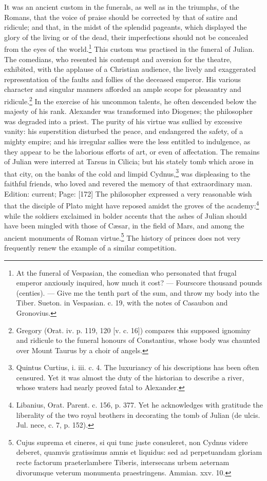 It was an ancient custom in the funerals, as well as in the triumphs, of the Romans, that the voice of praise should be corrected by that of satire and ridicule; and that, in the midst of the splendid pageants, which displayed the glory of the living or of the dead, their imperfections should not be concealed from the eyes of the world.\footnote{At the funeral of Vespasian, the comedian who personated that frugal emperor anxiously inquired, how much it cost? \texthebrew{—} Fourscore thousand pounds (centies). \texthebrew{—} Give me the tenth part of the sum, and throw my body into the Tiber. Sueton. in Vespasian. c. 19, with the notes of Casaubon and Gronovius.} This custom was practised in the funeral of Julian. The comedians, who resented his contempt and aversion for the theatre, exhibited, with the applause of a Christian audience, the lively and exaggerated representation of the faults and follies of the deceased emperor. His various character and singular manners afforded an ample scope for pleasantry and ridicule.\footnote{Gregory (Orat. iv. p. 119, 120 [v. c. 16]) compares this supposed ignominy and ridicule to the funeral honours of Constantius, whose body was chaunted over Mount Taurus by a choir of angels.} In the exercise of his uncommon talents, he often descended below the majesty of his rank. Alexander was transformed into Diogenes; the philosopher was degraded into a priest. The purity of his virtue was sullied by excessive vanity: his superstition disturbed the peace, and endangered the safety, of a mighty empire; and his irregular sallies were the less entitled to indulgence, as they appear to be the laborious efforts of art, or even of affectation. The remains of Julian were interred at Tarsus in Cilicia; but his stately tomb which arose in that city, on the banks of the cold and limpid Cydnus,\footnote{Quintus Curtius, i. iii. c. 4. The luxuriancy of his descriptions has been often censured. Yet it was almost the duty of the historian to describe a river, whose waters had nearly proved fatal to Alexander.} was displeasing to the faithful friends, who loved and revered the memory of that extraordinary man. Edition: current; Page: [172] The philosopher expressed a very reasonable wish that the disciple of Plato might have reposed amidst the groves of the academy:\footnote{Libanius, Orat. Parent. c. 156, p. 377. Yet he acknowledges with gratitude the liberality of the two royal brothers in decorating the tomb of Julian (de ulcis. Jul. nece, c. 7, p. 152).} while the soldiers exclaimed in bolder accents that the ashes of Julian should have been mingled with those of Cæsar, in the field of Mars, and among the ancient monuments of Roman virtue.\footnote{Cujus suprema et cineres, si qui tunc juste consuleret, non Cydnus videre deberet, quamvis gratissimus amnis et liquidus: sed ad perpetuandam gloriam recte factorum praeterlambere Tiberis, intersecans urbem aeternam divorumque veterum monumenta praestringens. Ammian. xxv. 10.} The history of princes does not very frequently renew the example of a similar competition.

